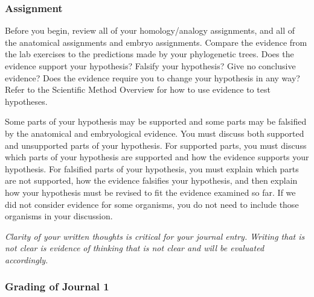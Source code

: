 \documentclass[12pt]{exam}
\begin{document}
\subsubsection*{Assignment}

Before you begin, review all of your
homology/analogy assignments, and all of the anatomical assignments and
embryo assignments. Compare the evidence from the lab exercises to the predictions made by your phylogenetic trees. Does the evidence support your
hypothesis? Falsify your hypothesis? Give no conclusive evidence? Does the evidence
require you to change your hypothesis in any way? Refer to the Scientific Method
Overview for how to use evidence to test hypotheses.

Some parts of your hypothesis may be supported and
some parts may be falsified by the anatomical and embryological evidence.
You must discuss both supported and unsupported parts of your
hypothesis. For supported parts, you must discuss which parts of your
hypothesis are supported and how the evidence supports your hypothesis.
For falsified parts of your hypothesis, you must explain which parts are
not supported, how the evidence falsifies your hypothesis, and then
explain how your hypothesis must be revised to fit the evidence examined
so far. If we did not consider evidence for some organisms, you do not
need to include those organisms in your discussion.

\emph{Clarity of your written thoughts is critical for your journal entry. Writing that is not clear is evidence of
 thinking that is not clear and will be evaluated accordingly.}

\subsubsection*{Grading of Journal 1}
\end{document}
